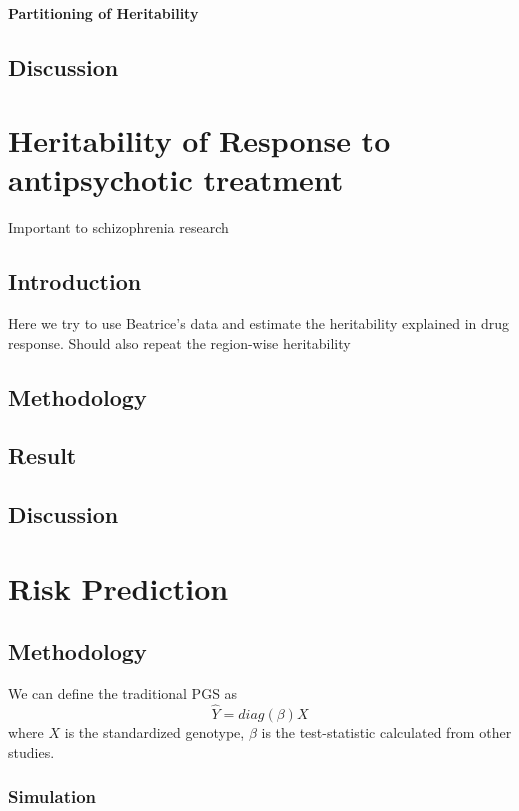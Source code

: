\documentclass{book}
\begin{document}
	
	
	
	\subsubsection{Partitioning of Heritability}
	
	\section{Discussion}
	\chapter{Heritability of Response to antipsychotic treatment}
	Important to schizophrenia research
	
	\section{Introduction}
	Here we try to use Beatrice's data and estimate the heritability explained in drug response.
	Should also repeat the region-wise heritability
	\section{Methodology}
	\section{Result}
	\section{Discussion}
	\chapter{Risk Prediction}
	\section{Methodology}
	We can define the traditional \gls{PGS} as
	\begin{equation}
	\hat{Y} = diag(\beta)X
	\end{equation}
	where $X$ is the standardized genotype, $\beta$ is the test-statistic calculated from other studies. 
	
	
	\subsection{Simulation}
\end{document}
